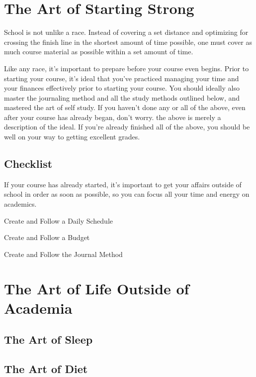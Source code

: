 \documentclass{book}
\begin{document}
\tableofcontents
\mainmatter
\setlength{\parskip}{0.5 cm}

\chapter{The Art of Starting Strong}

School is not unlike a race. Instead of covering a set distance and optimizing for crossing the finish line in the shortest amount of time possible, one must cover as much course material as possible within a set amount of time. 

Like any race, it's important to prepare before your course even begins. Prior to starting your course, it's ideal that you've practiced managing your time and your finances effectively prior to starting your course. You should ideally also master the journaling method and all the study methods outlined below, and mastered the art of self study. If you haven't done any or all of the above, even after your course has already began, don't worry. the above is merely a description of the ideal. If you're already finished all of the above, you should be well on your way to getting excellent grades. 

\section{Checklist}

If your course has already started, it's important to get your affairs outside of school in order as soon as possible, so you can focus all your time and energy on academics. 

\begin{todolist}
\item Create and Follow a Daily Schedule
\item Create and Follow a Budget
\item Create and Follow the Journal Method 
\end{todolist} 

\chapter{The Art of Life Outside of Academia}

\section{The Art of Sleep}

\section{The Art of Diet}
\end{document}
